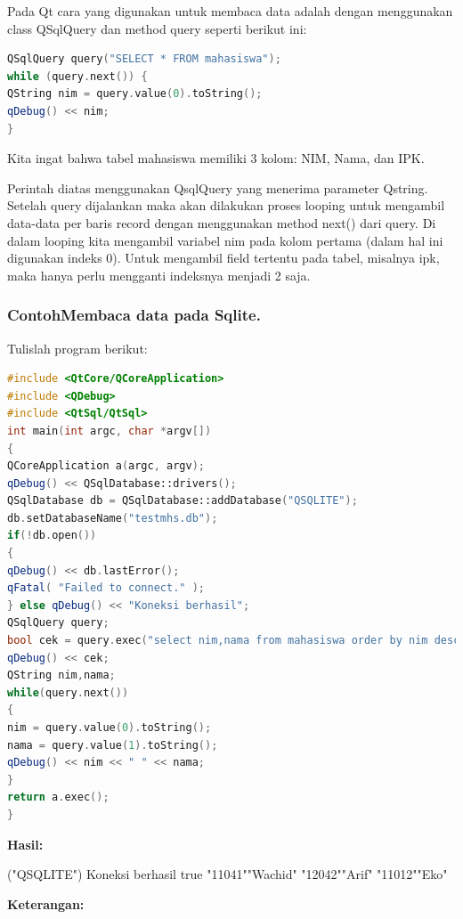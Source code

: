 Pada Qt cara yang digunakan untuk membaca data adalah dengan menggunakan
class QSqlQuery dan method query seperti berikut ini:

\begin{lstlisting}[language=c++, numbers=none]
QSqlQuery query("SELECT * FROM mahasiswa");
while (query.next()) {
QString nim = query.value(0).toString();
qDebug() << nim;
}
\end{lstlisting}

Kita ingat bahwa tabel mahasiswa memiliki 3 kolom: NIM, Nama, dan IPK.

Perintah diatas menggunakan QsqlQuery yang menerima parameter Qstring.
Setelah query dijalankan maka akan dilakukan proses looping untuk
mengambil data-data per baris record dengan menggunakan method next()
dari query. Di dalam looping kita mengambil variabel nim pada kolom
pertama (dalam hal ini digunakan indeks 0). Untuk mengambil field
tertentu pada tabel, misalnya ipk, maka hanya perlu mengganti indeksnya
menjadi 2 saja.

\subsubsection*{ContohMembaca data pada Sqlite.}

Tulislah program berikut:

\begin{lstlisting}[language=c++, caption= Membaca data pada Sqlite]
#include <QtCore/QCoreApplication>
#include <QDebug>
#include <QtSql/QtSql>
int main(int argc, char *argv[])
{
QCoreApplication a(argc, argv);
qDebug() << QSqlDatabase::drivers();
QSqlDatabase db = QSqlDatabase::addDatabase("QSQLITE");
db.setDatabaseName("testmhs.db");
if(!db.open())
{
qDebug() << db.lastError();
qFatal( "Failed to connect." );
} else qDebug() << "Koneksi berhasil";
QSqlQuery query;
bool cek = query.exec("select nim,nama from mahasiswa order by nim desc");
qDebug() << cek;
QString nim,nama;
while(query.next())
{
nim = query.value(0).toString();
nama = query.value(1).toString();
qDebug() << nim << " " << nama;
}
return a.exec();
}
\end{lstlisting}

\textbf{Hasil:}

\begin{lcverbatim}
("QSQLITE")
Koneksi berhasil
true
"11041""Wachid"
"12042""Arif"
"11012""Eko"
\end{lcverbatim}

\textbf{Keterangan:}


